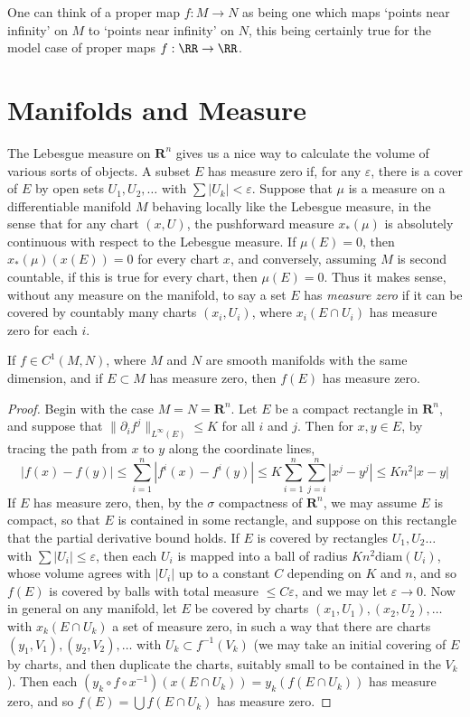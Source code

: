 One can think of a proper map $f: M \to N$ as being one which maps `points near infinity' on $M$ to `points near infinity' on $N$, this being certainly true for the model case of proper maps $f: \RR \to \RR$.

\section{Manifolds and Measure}

The Lebesgue measure on $\mathbf{R}^n$ gives us a nice way to calculate the volume of various sorts of objects. A subset $E$ has measure zero if, for any $\varepsilon$, there is a cover of $E$ by open sets $U_1, U_2, \dots$ with $\sum |U_k| < \varepsilon$. Suppose that $\mu$ is a measure on a differentiable manifold $M$ behaving locally like the Lebesgue measure, in the sense that for any chart $(x,U)$, the pushforward measure $x_*(\mu)$ is absolutely continuous with respect to the Lebesgue measure. If $\mu(E) = 0$, then $x_*(\mu)(x(E)) = 0$ for every chart $x$, and conversely, assuming $M$ is second countable, if this is true for every chart, then $\mu(E) = 0$. Thus it makes sense, without any measure on the manifold, to say a set $E$ has \emph{measure zero} if it can be covered by countably many charts $(x_i,U_i)$, where $x_i(E \cap U_i)$ has measure zero for each $i$.

\begin{lemma}
    If $f \in C^1(M,N)$, where $M$ and $N$ are smooth manifolds with the same dimension, and if $E \subset M$ has measure zero, then $f(E)$ has measure zero.
\end{lemma}
\begin{proof}
    Begin with the case $M = N = \mathbf{R}^n$. Let $E$ be a compact rectangle in $\mathbf{R}^n$, and suppose that $\| \partial_i f^j \|_{L^\infty(E)} \leq K$ for all $i$ and $j$. Then for $x,y \in E$, by tracing the path from $x$ to $y$ along the coordinate lines,
    \[ |f(x) - f(y)| \leq \sum_{i = 1}^n |f^i(x) - f^i(y)| \leq K \sum_{i = 1}^n \sum_{j = i}^n |x^j - y^j| \leq Kn^2 |x-y| \]
    If $E$ has measure zero, then, by the $\sigma$ compactness of $\mathbf{R}^n$, we may assume $E$ is compact, so that $E$ is contained in some rectangle, and suppose on this rectangle that the partial derivative bound holds. If $E$ is covered by rectangles $U_1, U_2 \dots$ with $\sum |U_i| \leq \varepsilon$, then each $U_i$ is mapped into a ball of radius $Kn^2 \text{diam}(U_i)$, whose volume agrees with $|U_i|$ up to a constant $C$ depending on $K$ and $n$, and so $f(E)$ is covered by balls with total measure $\leq C\varepsilon$, and we may let $\varepsilon \to 0$. Now in general on any manifold, let $E$ be covered by charts $(x_1,U_1), (x_2,U_2), \dots$ with $x_k(E \cap U_k)$ a set of measure zero, in such a way that there are charts $(y_1,V_1), (y_2,V_2), \dots$ with $U_k \subset f^{-1}(V_k)$ (we may take an initial covering of $E$ by charts, and then duplicate the charts, suitably small to be contained in the $V_k$). Then each $(y_k \circ f \circ x^{-1})(x(E \cap U_k)) = y_k(f(E \cap U_k))$ has measure zero, and so $f(E) = \bigcup f(E \cap U_k)$ has measure zero.
\end{proof}

